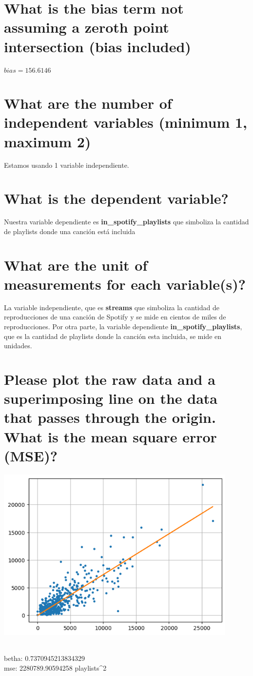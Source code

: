 \documentclass{report}
\begin{document}
        \section{What is the bias term not assuming a zero\-th point intersection (bias included)}
            $ bias = 156.6146 $
        \section{What are the number of independent variables (minimum 1, maximum 2)}
            Estamos usando 1 variable independiente.

        \section{What is the dependent variable?}
            Nuestra variable dependiente es \textbf{in\_spotify\_playlists} que simboliza la cantidad de playlists donde una canci\'on est\'a incluida

        \section{What are the unit of measurements for each variable(s)?}
            La variable independiente, que es \textbf{streams} que simboliza la cantidad de reproducciones de una canci\'on de Spotify y se mide en cientos de miles de reproducciones. Por otra parte, la variable dependiente \textbf{in\_spotify\_playlists}, que es la cantidad de playlists donde la canci\'on esta incluida, se mide en unidades.

        \section{Please plot the raw data and a superimposing line on the data that passes through the origin. What is the mean square error (MSE)?}
            {\includegraphics[width=0.9\textwidth]{latex/question9.png}\par} \\
            betha: 0.7370945213834329 \\
            mse: 2280789.90594258 playlists^2
\end{document}
